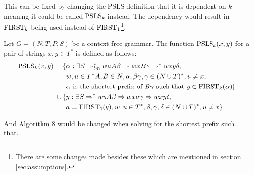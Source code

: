 This can be fixed by changing the PSLS definition that it is dependent on $k$ meaning it could be called $\PSLS_k$ instead. The dependency would result in $\text{FIRST}_k$ being used instead of $\text{FIRST}_1$\footnote{There are some changes made besides these which are mentioned in section \ref{sec:assumptions}.}.
\begin{definition}[$\PSLS_k$]
    Let $G = (N, T, P, S)$ be a context-free grammar. The function $\text{PSLS}_k(x, y)$ for a pair of strings $x, y \in T^*$ is defined as follows:
    \begin{align*}
        \text{PSLS}_k(x, y) = \{ & \alpha : \exists S \Rightarrow^*_{lm} wuA\beta \Rightarrow wxB\gamma \Rightarrow^* wxy\delta, \\
        & w, u \in T^* A, B \in N, \alpha, \beta \gamma, \gamma \in (N \cup T)^*, u \neq x, \\
        & \alpha \text{ is the shortest prefix of } B\gamma \text{ such that } y \in \text{FIRST}_k(\alpha) \} \\
        \cup \: \{ & y : \exists S \Rightarrow^* wuA\beta \Rightarrow wxa\gamma \Rightarrow wxy\delta, \\
        & a = \text{FIRST}_1(y), w,u \in T^*, \beta, \gamma, \delta \in (N \cup T)^*, u \neq x \}
    \end{align*}
\end{definition}
\noindent And Algorithm 8 would be changed when solving for the shortest prefix such that.
